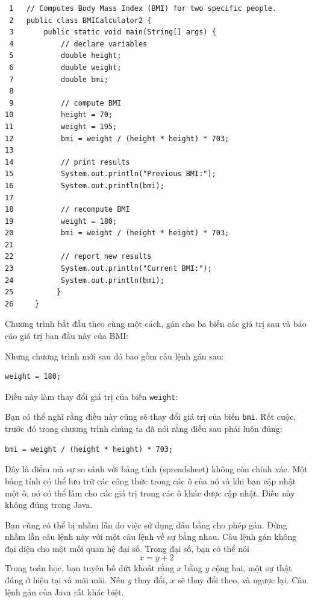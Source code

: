 \begin{verbatim}
 1   // Computes Body Mass Index (BMI) for two specific people.
 2   public class BMICalculator2 {
 3       public static void main(String[] args) {
 4           // declare variables
 5           double height;
 6           double weight;
 7           double bmi;
 8
 9           // compute BMI
10           height = 70;
11           weight = 195;
12           bmi = weight / (height * height) * 703;
13
14           // print results
15           System.out.println("Previous BMI:");
16           System.out.println(bmi);
17
18           // recompute BMI
19           weight = 180;
20           bmi = weight / (height * height) * 703;
21
22           // report new results
23           System.out.println("Current BMI:");
24           System.out.println(bmi);
25          }
26     }
\end{verbatim}

Chương trình bắt đầu theo cùng một cách, gán cho ba biến các giá trị sau
và báo cáo giá trị ban đầu này của BMI:

Nhưng chương trình mới sau đó bao gồm câu lệnh gán sau:

\begin{verbatim}
weight = 180;
\end{verbatim}

Điều này làm thay đổi giá trị của biến \texttt{weight}:

Bạn có thể nghĩ rằng điều này cũng sẽ thay đổi giá trị của biến
\texttt{bmi}. Rốt cuộc, trước đó trong chương trình chúng ta đã nói rằng
điều sau phải luôn đúng:

\begin{verbatim}
bmi = weight / (height * height) * 703;
\end{verbatim}

Đây là điểm mà sự so sánh với bảng tính (spreadsheet) không còn chính
xác. Một bảng tính có thể lưu trữ các công thức trong các ô của nó và
khi bạn cập nhật một ô, nó có thể làm cho các giá trị trong các ô khác
được cập nhật. Điều này không đúng trong Java.

Bạn cũng có thể bị nhầm lẫn do việc sử dụng dấu bằng cho phép gán. Đừng
nhầm lẫn câu lệnh này với một câu lệnh về sự bằng nhau. Câu lệnh gán
không đại diện cho một mối quan hệ đại số. Trong đại số, bạn có thể nói
\[ x = y + 2 \] Trong toán học, bạn tuyên bố dứt khoát rằng \(x\) bằng
\(y\) cộng hai, một sự thật đúng ở hiện tại và mãi mãi. Nếu \(y\) thay
đổi, \(x\) sẽ thay đổi theo, và ngược lại. Câu lệnh gán của Java rất
khác biệt.

